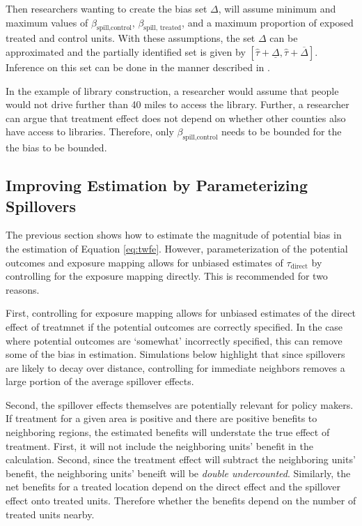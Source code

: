 \documentclass[11pt]{article}
\begin{document}
Then researchers wanting to create the bias set $\Delta$, will assume minimum and maximum values of $\beta_{\text{spill,control}}$, $\beta_{\text{spill, treated}}$, and a maximum proportion of exposed treated and control units. With these assumptions, the set $\Delta$ can be approximated and the partially identified set is given by $[\hat{\tau} + \underline{\Delta}, \hat{\tau} + \overline{\Delta}]$. Inference on this set can be done in the manner described in \citet{Rambachan_Roth_2020}. 

In the example of library construction, a researcher would assume that people would not drive further than 40 miles to access the library. Further, a researcher can argue that treatment effect does not depend on whether other counties also have access to libraries. Therefore, only $\beta_{\text{spill,control}}$ needs to be bounded for the the bias to be bounded. 


\subsection{Improving Estimation by Parameterizing Spillovers}

The previous section shows how to estimate the magnitude of potential bias in the estimation of Equation \ref{eq:twfe}. However, parameterization of the potential outcomes and exposure mapping allows for unbiased estimates of $\tau_{\text{direct}}$ by controlling for the exposure mapping directly. This is recommended for two reasons. 

First, controlling for exposure mapping allows for unbiased estimates of the direct effect of treatmnet if the potential outcomes are correctly specified. In the case where potential outcomes are `somewhat' incorrectly specified, this can remove some of the bias in estimation. Simulations below highlight that since spillovers are likely to decay over distance, controlling for immediate neighbors removes a large portion of the average spillover effects.

Second, the spillover effects themselves are potentially relevant for policy makers. If treatment for a given area is positive and there are positive benefits to neighboring regions, the estimated benefits will understate the true effect of treatment. First, it will not include the neighboring units' benefit in the calculation. Second, since the treatment effect will subtract the neighboring units' benefit, the neighboring units' beneift will be \emph{double undercounted}. Similarly, the net benefits for a treated location depend on the direct effect and the spillover effect onto treated units. Therefore whether the benefits depend on the number of treated units nearby.
\end{document}
